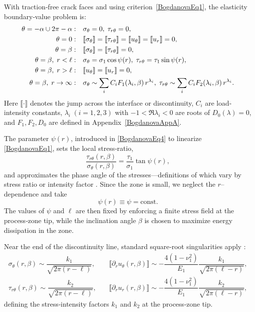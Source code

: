 With traction‐free crack faces and using criterion~\eqref{BogdanovaEq1}, the elasticity boundary‐value problem is:
\begin{align}
	\theta=-\alpha\cup2\pi-\alpha:\quad 
	&\sigma_{\theta}=0,\;\tau_{r\theta}=0, 
	\label{BogdanovaEq2}\\
	\theta=0:\quad 
	&\llbracket\sigma_{\theta}\rrbracket
	=\llbracket\tau_{r\theta}\rrbracket
	=\llbracket u_{\theta}\rrbracket
	=\llbracket u_{r}\rrbracket=0, 
	\notag\\
	\theta=\beta :\quad 
	&\llbracket\sigma_{\theta}\rrbracket
	=\llbracket\tau_{r\theta}\rrbracket=0, 
	\label{BogdanovaEq3}\\
	\theta=\beta,\;r<\ell:\quad 
	&\sigma_{\theta}=\sigma_{1}\cos\psi(r),\;
	\tau_{r\theta}=\tau_{1}\sin\psi(r),
	\notag \\
	\theta=\beta,\;r>\ell:\quad 
	&\llbracket u_{\theta}\rrbracket
	=\llbracket u_{r}\rrbracket=0,
	\label{BogdanovaEq4}\\
	\theta=\beta,\;r\to\infty:\quad 
	&\sigma_{\theta}\sim\sum_iC_iF_1(\lambda_i,\beta)\,r^{\lambda_i},\;
	\tau_{r\theta}\sim\sum_iC_iF_2(\lambda_i,\beta)\,r^{\lambda_i}.
	\label{BogdanovaEq5}
\end{align}
Here $\llbracket\cdot\rrbracket$ denotes the jump across the interface or discontinuity, $C_i$ are load‐intensity constants, $\lambda_i\;(i=1,2,3)$ with $-1<\Re\lambda_i<0$ are roots of $D_0(\lambda)=0$, and $F_1,F_2,D_0$ are defined in Appendix~\ref{BogdanovaAppA}.


The parameter $\psi(r)$, introduced in \eqref{BogdanovaEq4} to linearize \eqref{BogdanovaEq1}, sets the local stress‐ratio,
\[
\frac{\tau_{r\theta}(r,\beta)}{\sigma_{\theta}(r,\beta)}
= \frac{\tau_{1}}{\sigma_{1}}\tan\psi(r),
\]
and approximates the phase angle of the stresses—definitions of which vary by stress ratio or intensity factor \cite{Bogdanova35}. Since the zone is small, we neglect the $r$–dependence and take
\[
\psi(r)\equiv\psi=\text{const}.
\]
The values of $\psi$ and $\ell$ are then fixed by enforcing a finite stress field at the process‐zone tip, while the inclination angle $\beta$ is chosen to maximize energy dissipation in the zone.

Near the end of the discontinuity line, standard square‐root singularities apply \cite{Bogdanova8,Bogdanova34}:
\begin{equation}\label{BogdanovaEq6}
	\begin{array}{ll}
\sigma_{\theta}(r,\beta)\sim\dfrac{k_1}{\sqrt{2\pi(r-\ell)}},&\quad
\llbracket\partial_r u_{\theta}(r,\beta)\rrbracket\sim
-\dfrac{4(1-\nu_1^2)}{E_1}\dfrac{k_1}{\sqrt{2\pi(\ell-r)}},
\\
\tau_{r\theta}(r,\beta)\sim\dfrac{k_2}{\sqrt{2\pi(r-\ell)}},&\quad
\llbracket\partial_r u_{r}(r,\beta)\rrbracket\sim
-\dfrac{4(1-\nu_1^2)}{E_1}\dfrac{k_2}{\sqrt{2\pi(\ell-r)}},
\end{array}
\end{equation}
defining the stress‐intensity factors $k_1$ and $k_2$ at the process‐zone tip.

